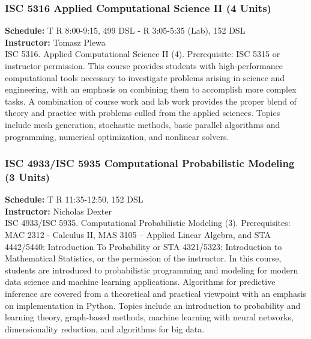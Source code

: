 \documentclass[12pt,a4paper]{article}
\begin{document}
\subsubsection*{ISC 5316 Applied Computational Science II (4 Units)}
\textbf{Schedule:} T R 8:00-9:15, 499 DSL - R 3:05-5:35 (Lab), 152 DSL \\
\textbf{Instructor:} Tomasz Plewa \\
ISC 5316. Applied Computational Science II (4). Prerequisite: ISC 5315 or instructor permission. This course provides students with high-performance computational tools necessary to investigate problems arising in science and engineering, with an emphasis on combining them to accomplish more complex tasks. A combination of course work and lab work provides the proper blend of theory and practice with problems culled from the applied sciences. Topics include mesh generation, stochastic methods, basic parallel algorithms and programming, numerical optimization, and nonlinear solvers.

\subsubsection*{ISC 4933/ISC 5935 Computational Probabilistic Modeling (3 Units)}
\textbf{Schedule:} T R 11:35-12:50, 152 DSL \\
\textbf{Instructor:} Nicholas Dexter \\
ISC 4933/ISC 5935. Computational Probabilistic Modeling (3). Prerequisites: MAC 2312 - Calculus II, MAS 3105 – Applied Linear Algebra, and STA 4442/5440: Introduction To Probability or STA 4321/5323: Introduction to Mathematical Statistics, or the permission of the instructor. In this course, students are introduced to probabilistic programming and modeling for modern data science and machine learning applications. Algorithms for predictive inference are covered from a theoretical and practical viewpoint with an emphasis on implementation in Python. Topics include an introduction to probability and learning theory, graph-based methods, machine learning with neural networks, dimensionality reduction, and algorithms for big data.
\end{document}
